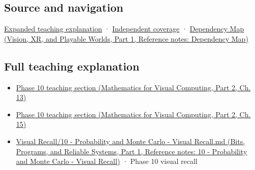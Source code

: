\subsection{Source and navigation}\label{appendix-4192b2bdd21e-source-and-navigation}

\hypertarget{appendix-4192b2bdd21e-source-and-navigation}{}

\hyperref[04-visual-computing-ii-ch042-multiresolution-work-must-preserve-the-right-information]{Expanded teaching explanation} · \hyperref[appendix-fd090d982a15-xr01---independent-seeing-and-representation-source]{Independent coverage} · \href{../07-Vision-XR-and-Playable-Worlds-P01/main.pdf\#appendix-4ad47bdd269a}{Dependency Map (Vision, XR, and Playable Worlds, Part 1, Reference notes: Dependency Map)}

\subsection{Full teaching explanation}\label{appendix-4192b2bdd21e-full-teaching-explanation}

\hypertarget{appendix-4192b2bdd21e-full-teaching-explanation}{}

\begin{itemize}
\tightlist
\item
  \href{../02-Mathematics-for-Visual-Computing-P02/main.pdf\#02-foundations-ii-ch029-a-computer-produces-deterministic-pseudorandom-sequences}{Phase 10 teaching section (Mathematics for Visual Computing, Part 2, Ch. 13)}
\item
  \href{../02-Mathematics-for-Visual-Computing-P02/main.pdf\#02-foundations-ii-ch031-use-probability-to-evaluate-graphics-and-research-claims}{Phase 10 teaching section (Mathematics for Visual Computing, Part 2, Ch. 15)}
\item
  \href{../01-Bits-Programs-and-Reliable-Systems-P01/main.pdf\#appendix-cb5af353ef77}{Visual Recall/10 - Probability and Monte Carlo - Visual Recall.md (Bits, Programs, and Reliable Systems, Part 1, Reference notes: 10 - Probability and Monte Carlo - Visual Recall)} · Phase 10 visual recall
\end{itemize}
